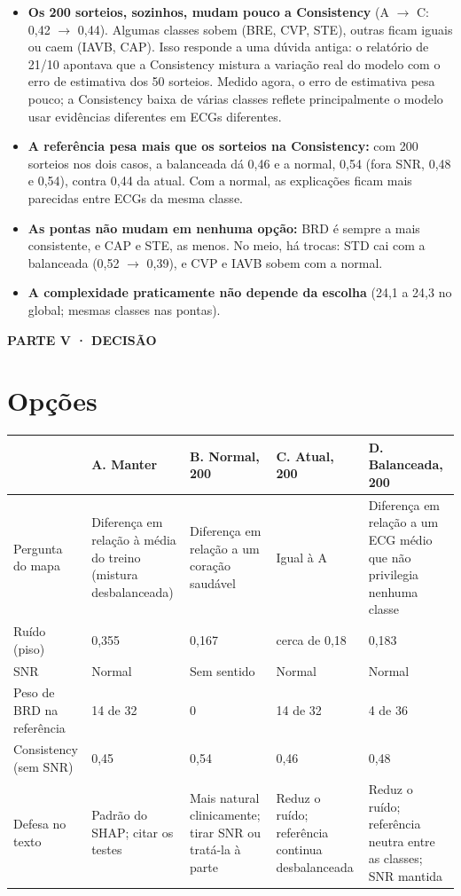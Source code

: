 \documentclass[11pt,a4paper]{article}
\newcommand{\partbar}[1]{\par\vspace{1.2em}\noindent\colorbox{black!80}{\parbox{\dimexpr\linewidth-2\fboxsep}{\color{white}\bfseries\sffamily\MakeUppercase{#1}}}\par\vspace{0.4em}}
\begin{document}
\begin{itemize}
\item \textbf{Os 200 sorteios, sozinhos, mudam pouco a Consistency} (A $\to$ C: 0,42 $\to$ 0,44). Algumas classes sobem (BRE, CVP, STE), outras ficam iguais ou caem (IAVB, CAP). Isso responde a uma dúvida antiga: o relatório de 21/10 apontava que a Consistency mistura a variação real do modelo com o erro de estimativa dos 50 sorteios. Medido agora, o erro de estimativa pesa pouco; a Consistency baixa de várias classes reflete principalmente o modelo usar evidências diferentes em ECGs diferentes.
\item \textbf{A referência pesa mais que os sorteios na Consistency:} com 200 sorteios nos dois casos, a balanceada dá 0,46 e a normal, 0,54 (fora SNR, 0,48 e 0,54), contra 0,44 da atual. Com a normal, as explicações ficam mais parecidas entre ECGs da mesma classe.
\item \textbf{As pontas não mudam em nenhuma opção:} BRD é sempre a mais consistente, e CAP e STE, as menos. No meio, há trocas: STD cai com a balanceada (0,52 $\to$ 0,39), e CVP e IAVB sobem com a normal.
\item \textbf{A complexidade praticamente não depende da escolha} (24,1 a 24,3 no global; mesmas classes nas pontas).
\end{itemize}

\partbar{Parte V · Decisão}

\section{Opções}
\begin{center}\small
\setlength{\tabcolsep}{4pt}
\begin{tabularx}{\linewidth}{lXXXX}
\toprule
& \textbf{A. Manter} & \textbf{B. Normal, 200} & \textbf{C. Atual, 200} & \textbf{D. Balanceada, 200} \\
\midrule
Pergunta do mapa & Diferença em relação à média do treino (mistura desbalanceada) & Diferença em relação a um coração saudável & Igual à A & Diferença em relação a um ECG médio que não privilegia nenhuma classe \\ \addlinespace
Ruído (piso) & 0,355 & 0,167 & cerca de 0,18 & 0,183 \\ \addlinespace
SNR & Normal & Sem sentido & Normal & Normal \\ \addlinespace
Peso de BRD na referência & 14 de 32 & 0 & 14 de 32 & 4 de 36 \\ \addlinespace
Consistency (sem SNR) & 0,45 & 0,54 & 0,46 & 0,48 \\ \addlinespace
Defesa no texto & Padrão do SHAP; citar os testes & Mais natural clinicamente; tirar SNR ou tratá-la à parte & Reduz o ruído; referência continua desbalanceada & Reduz o ruído; referência neutra entre as classes; SNR mantida \\
\bottomrule
\end{tabularx}
\end{center}
\end{document}
